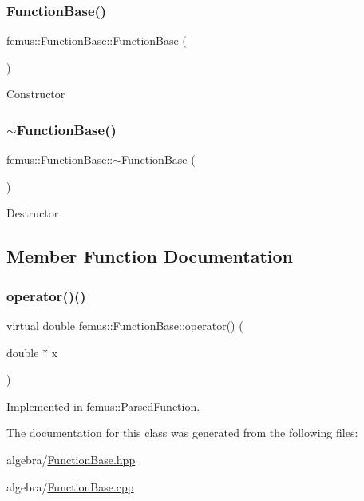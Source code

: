 \subsubsection{\texorpdfstring{Function\+Base()}{FunctionBase()}}
{\footnotesize\ttfamily femus\+::\+Function\+Base\+::\+Function\+Base (\begin{DoxyParamCaption}{ }\end{DoxyParamCaption})}

Constructor \mbox{\label{classfemus_1_1_function_base_a2e7f18ae75ee32d4fdd5de8df7e14c5d}} 
\subsubsection{\texorpdfstring{$\sim$\+Function\+Base()}{~FunctionBase()}}
{\footnotesize\ttfamily femus\+::\+Function\+Base\+::$\sim$\+Function\+Base (\begin{DoxyParamCaption}{ }\end{DoxyParamCaption})}

Destructor 

\subsection{Member Function Documentation}
\mbox{\label{classfemus_1_1_function_base_a2fdb73dd9cf7c4f4c4bdf28e4ee7f488}} 
\subsubsection{\texorpdfstring{operator()()}{operator()()}}
{\footnotesize\ttfamily virtual double femus\+::\+Function\+Base\+::operator() (\begin{DoxyParamCaption}\item[{double $\ast$}]{x }\end{DoxyParamCaption})\hspace{0.3cm}{\ttfamily [pure virtual]}}



Implemented in \mbox{\hyperlink{classfemus_1_1_parsed_function_a409352beeaf46414a0f063ecd20a2ff2}{femus\+::\+Parsed\+Function}}.



The documentation for this class was generated from the following files\+:\begin{DoxyCompactItemize}
\item 
algebra/\mbox{\hyperlink{_function_base_8hpp}{Function\+Base.\+hpp}}\item 
algebra/\mbox{\hyperlink{_function_base_8cpp}{Function\+Base.\+cpp}}\end{DoxyCompactItemize}
